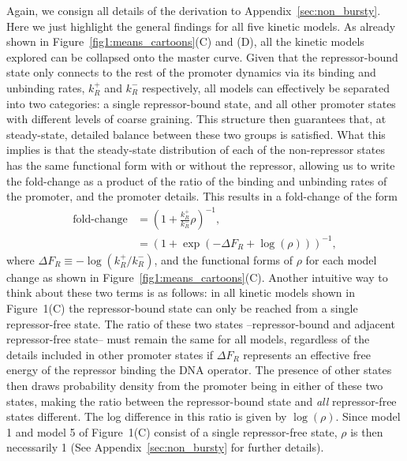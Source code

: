 Again, we consign all details of the derivation to
Appendix~\ref{sec:non_bursty}. Here we just highlight the general findings for
all five kinetic models. As already shown in Figure~\ref{fig1:means_cartoons}(C)
and (D), all the kinetic models explored can be collapsed onto the master curve.
Given that the repressor-bound state only connects to the rest of the promoter
dynamics via its binding and unbinding rates, $k_R^+$ and $k_R^-$ respectively,
all models can effectively be separated into two categories: a single
repressor-bound state, and all other promoter states with different levels of
coarse graining. This structure then guarantees that, at steady-state, detailed
balance between these two groups is satisfied. What this implies is that the
steady-state distribution of each of the non-repressor states has the same
functional form with or without the repressor, allowing us to write the
fold-change as a product of the ratio of the binding and unbinding rates of the
promoter, and the promoter details. This results in a fold-change of the form
\begin{align}
\text{fold-change} &= \left( 1 + \frac{k_R^+}{k_R^-} \rho \right)^{-1},\\
&= (1 + \exp(-\Delta F_R + \log(\rho) ))^{-1},
\end{align}
where $\Delta F_R \equiv -\log(k_R^+/k_R^-)$, and the functional forms of $\rho$
for each model change as shown in Figure~\ref{fig1:means_cartoons}(C). Another
intuitive way to think about these two terms is as follows: in all kinetic
models shown in Figure~1(C) the repressor-bound state can only be reached from a
single repressor-free state. The ratio of these two states --repressor-bound and
adjacent repressor-free state-- must remain the same for all models, regardless
of the details included in other promoter states if $\Delta F_R$ represents an
effective free energy of the repressor binding the DNA operator. The presence of
other states then draws probability density from the promoter being in either of
these two states, making the ratio between the repressor-bound state and
\textit{all} repressor-free states different. The log difference in this ratio
is given by $\log(\rho)$. Since model 1 and model 5 of Figure~1(C) consist of a
single repressor-free state, $\rho$ is then necessarily 1 (See
Appendix~\ref{sec:non_bursty} for further details).

